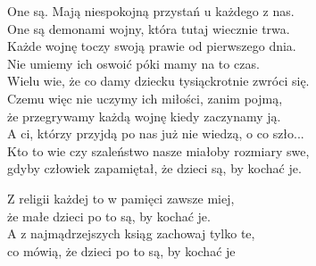 \begin{text}
    One są. Mają niespokojną przystań u każdego z nas.\\
    One są demonami wojny, która tutaj wiecznie trwa.\\
    Każde wojnę toczy swoją prawie od pierwszego dnia.\\
    Nie umiemy ich oswoić póki mamy na to czas.\\
    Wielu wie, że co damy dziecku tysiąckrotnie zwróci się.\\
    Czemu więc nie uczymy ich miłości, zanim pojmą,\\
    że przegrywamy każdą wojnę kiedy zaczynamy ją.\\
    A ci, którzy przyjdą po nas już nie wiedzą, o co szło...\\
    Kto to wie czy szaleństwo nasze miałoby rozmiary swe,\\
    gdyby człowiek zapamiętał, że dzieci są, by kochać je.

    Z religii każdej to w pamięci zawsze miej,\\
    że małe dzieci po to są, by kochać je.\\
    A z najmądrzejszych ksiąg zachowaj tylko te,\\
    co mówią, że dzieci po to są, by kochać je
\end{text}
\begin{chord}

\end{chord}